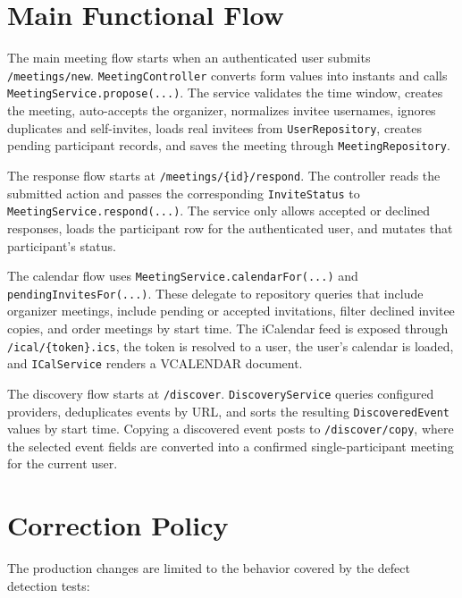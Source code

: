 \section{Main Functional Flow}

The main meeting flow starts when an authenticated user submits \texttt{/meetings/new}. \texttt{MeetingController} converts form values into instants and calls \texttt{MeetingService.propose(...)}. The service validates the time window, creates the meeting, auto-accepts the organizer, normalizes invitee usernames, ignores duplicates and self-invites, loads real invitees from \texttt{UserRepository}, creates pending participant records, and saves the meeting through \texttt{MeetingRepository}.

The response flow starts at \texttt{/meetings/\{id\}/respond}. The controller reads the submitted action and passes the corresponding \texttt{InviteStatus} to \texttt{MeetingService.respond(...)}. The service only allows accepted or declined responses, loads the participant row for the authenticated user, and mutates that participant's status.

The calendar flow uses \texttt{MeetingService.calendarFor(...)} and \texttt{pendingInvitesFor(...)}. These delegate to repository queries that include organizer meetings, include pending or accepted invitations, filter declined invitee copies, and order meetings by start time. The iCalendar feed is exposed through \texttt{/ical/\{token\}.ics}, the token is resolved to a user, the user's calendar is loaded, and \texttt{ICalService} renders a VCALENDAR document.

The discovery flow starts at \texttt{/discover}. \texttt{DiscoveryService} queries configured providers, deduplicates events by URL, and sorts the resulting \texttt{DiscoveredEvent} values by start time. Copying a discovered event posts to \texttt{/discover/copy}, where the selected event fields are converted into a confirmed single-participant meeting for the current user.

\section{Correction Policy}

The production changes are limited to the behavior covered by the defect detection tests:

